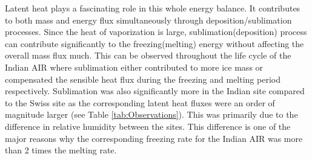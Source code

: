 \documentclass[utf8]{frontiersSCNS} %
\begin{document}
Latent heat plays a fascinating role in this whole energy balance. It contributes to both mass and energy flux
simultaneously through deposition/sublimation processes. Since the heat of vaporization is large,
sublimation(deposition) process can contribute significantly to the freezing(melting) energy without affecting the
overall mass flux much. This can be observed throughout the life cycle of the Indian AIR where sublimation either
contributed to more ice mass or compensated the sensible heat flux during the freezing and melting period respectively.
Sublimation was also significantly more in the Indian site compared to the Swiss site as the corresponding latent heat
fluxes were an order of magnitude larger (see Table \ref{tab:Observations}). This was primarily due to the difference in
relative humidity between the sites. This difference is one of the major reasons why the corresponding freezing rate 
for the Indian AIR was more than 2 times the melting rate.
\end{document}
